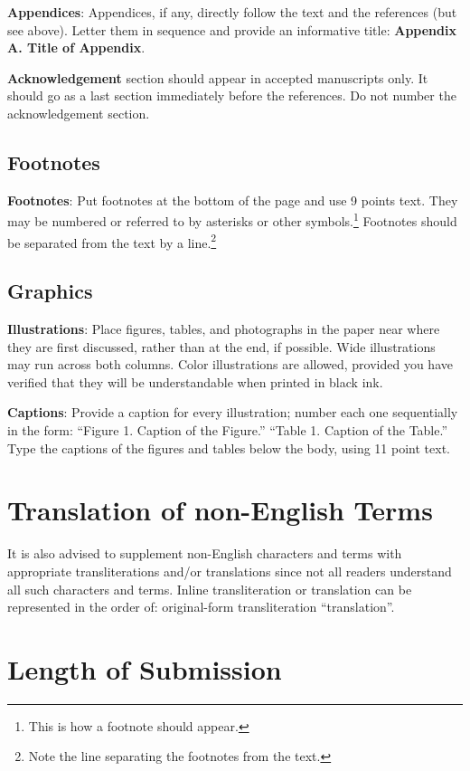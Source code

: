 \documentclass[11pt]{article}
\begin{document}
{\bf Appendices}: Appendices, if any, directly follow the text and the
references (but see above).  Letter them in sequence and provide an
informative title: {\bf Appendix A. Title of Appendix}.

\textbf{Acknowledgement} section should appear in accepted manuscripts
only. It should go as a last section immediately
before the references.  Do not number the acknowledgement section.


\subsection{Footnotes}

{\bf Footnotes}: Put footnotes at the bottom of the page and use 9
points text. They may be numbered or referred to by asterisks or other
symbols.\footnote{This is how a footnote should appear.} Footnotes
should be separated from the text by a line.\footnote{Note the line
separating the footnotes from the text.}

\subsection{Graphics}

{\bf Illustrations}: Place figures, tables, and photographs in the
paper near where they are first discussed, rather than at the end, if
possible.  Wide illustrations may run across both columns.  Color
illustrations are allowed, provided you have verified that  
they will be understandable when printed in black ink.

{\bf Captions}: Provide a caption for every illustration; number each one
sequentially in the form:  ``Figure 1. Caption of the Figure.'' ``Table 1.
Caption of the Table.''  Type the captions of the figures and 
tables below the body, using 11 point text.  

\section{Translation of non-English Terms}

It is also advised to supplement non-English characters and terms
with appropriate transliterations and/or translations
since not all readers understand all such characters and terms.
Inline transliteration or translation can be represented in
the order of: original-form transliteration ``translation''.

\section{Length of Submission}
\label{sec:length}
\end{document}
